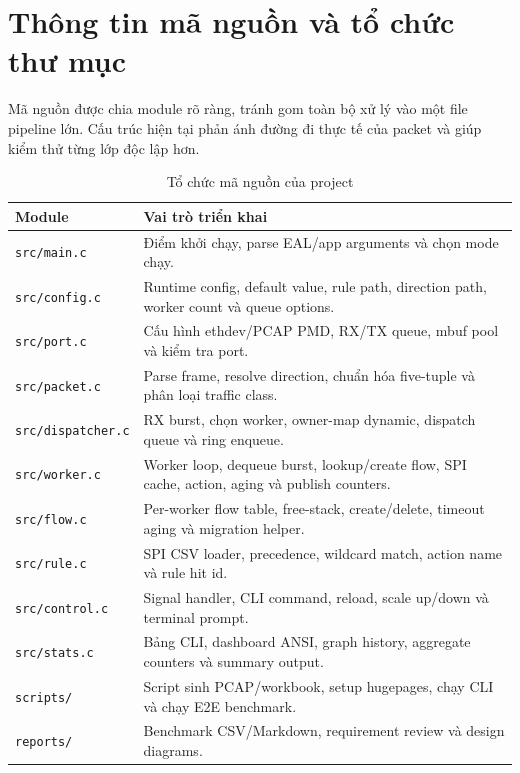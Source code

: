 \documentclass[12pt,a4paper,twoside]{report}
\newcommand{\code}[1]{\texttt{#1}}
\begin{document}
\section{Thông tin mã nguồn và tổ chức thư mục}
Mã nguồn được chia module rõ ràng, tránh gom toàn bộ xử lý vào một file
pipeline lớn. Cấu trúc hiện tại phản ánh đường đi thực tế của packet và giúp
kiểm thử từng lớp độc lập hơn.

\begin{table}[H]
\centering
\caption{Tổ chức mã nguồn của project}
\label{tab:module_tree}
\footnotesize
\setlength{\tabcolsep}{3pt}
\renewcommand{\arraystretch}{0.86}
\begin{tabular}{L{3.1cm} L{11.25cm}}
\toprule
\textbf{Module} & \textbf{Vai trò triển khai} \\
\midrule
\code{src/main.c} & Điểm khởi chạy, parse EAL/app arguments và chọn mode chạy. \\
\code{src/config.c} & Runtime config, default value, rule path, direction path, worker count và queue options. \\
\code{src/port.c} & Cấu hình ethdev/PCAP PMD, RX/TX queue, mbuf pool và kiểm tra port. \\
\code{src/packet.c} & Parse frame, resolve direction, chuẩn hóa five-tuple và phân loại traffic class. \\
\code{src/dispatcher.c} & RX burst, chọn worker, owner-map dynamic, dispatch queue và ring enqueue. \\
\code{src/worker.c} & Worker loop, dequeue burst, lookup/create flow, SPI cache, action, aging và publish counters. \\
\code{src/flow.c} & Per-worker flow table, free-stack, create/delete, timeout aging và migration helper. \\
\code{src/rule.c} & SPI CSV loader, precedence, wildcard match, action name và rule hit id. \\
\code{src/control.c} & Signal handler, CLI command, reload, scale up/down và terminal prompt. \\
\code{src/stats.c} & Bảng CLI, dashboard ANSI, graph history, aggregate counters và summary output. \\
\code{scripts/} & Script sinh PCAP/workbook, setup hugepages, chạy CLI và chạy E2E benchmark. \\
\code{reports/} & Benchmark CSV/Markdown, requirement review và design diagrams. \\
\bottomrule
\end{tabular}
\end{table}
\end{document}
